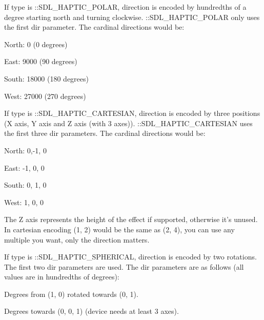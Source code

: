 If type is \+::\+S\+D\+L\+\_\+\+H\+A\+P\+T\+I\+C\+\_\+\+P\+O\+L\+A\+R, direction is encoded by hundredths of a degree starting north and turning clockwise. \+::\+S\+D\+L\+\_\+\+H\+A\+P\+T\+I\+C\+\_\+\+P\+O\+L\+A\+R only uses the first {\ttfamily dir} parameter. The cardinal directions would be\+:
\begin{DoxyItemize}
\item North\+: 0 (0 degrees)
\item East\+: 9000 (90 degrees)
\item South\+: 18000 (180 degrees)
\item West\+: 27000 (270 degrees)
\end{DoxyItemize}

If type is \+::\+S\+D\+L\+\_\+\+H\+A\+P\+T\+I\+C\+\_\+\+C\+A\+R\+T\+E\+S\+I\+A\+N, direction is encoded by three positions (X axis, Y axis and Z axis (with 3 axes)). \+::\+S\+D\+L\+\_\+\+H\+A\+P\+T\+I\+C\+\_\+\+C\+A\+R\+T\+E\+S\+I\+A\+N uses the first three {\ttfamily dir} parameters. The cardinal directions would be\+:
\begin{DoxyItemize}
\item North\+: 0,-\/1, 0
\item East\+: -\/1, 0, 0
\item South\+: 0, 1, 0
\item West\+: 1, 0, 0
\end{DoxyItemize}

The Z axis represents the height of the effect if supported, otherwise it's unused. In cartesian encoding (1, 2) would be the same as (2, 4), you can use any multiple you want, only the direction matters.

If type is \+::\+S\+D\+L\+\_\+\+H\+A\+P\+T\+I\+C\+\_\+\+S\+P\+H\+E\+R\+I\+C\+A\+L, direction is encoded by two rotations. The first two {\ttfamily dir} parameters are used. The {\ttfamily dir} parameters are as follows (all values are in hundredths of degrees)\+:
\begin{DoxyItemize}
\item Degrees from (1, 0) rotated towards (0, 1).
\item Degrees towards (0, 0, 1) (device needs at least 3 axes).
\end{DoxyItemize}

